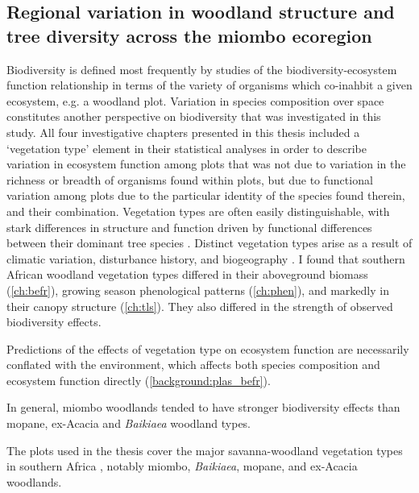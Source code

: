 \begin{refsection}


\subsection{Regional variation in woodland structure and tree diversity across the miombo ecoregion}

Biodiversity is defined most frequently by studies of the biodiversity-ecosystem function relationship in terms of the variety of organisms which co-inahbit a given ecosystem, e.g. a woodland plot. Variation in species composition over space constitutes another perspective on biodiversity that was investigated in this study. All four investigative chapters presented in this thesis included a `vegetation type' element in their statistical analyses in order to describe variation in ecosystem function among plots that was not due to variation in the richness or breadth of organisms found within plots, but due to functional variation among plots due to the particular identity of the species found therein, and their combination. Vegetation types are often easily distinguishable, with stark differences in structure and function driven by functional differences between their dominant tree species \citep{Solbrig1996}. Distinct vegetation types arise as a result of climatic variation, disturbance history, and biogeography \citep{}. I found that southern African woodland vegetation types differed in their aboveground biomass (\autoref{ch:befr}), growing season phenological patterns (\autoref{ch:phen}), and markedly in their canopy structure (\autoref{ch:tls}). They also differed in the strength of observed biodiversity effects. 

Predictions of the effects of vegetation type on ecosystem function are necessarily conflated with the environment, which affects both species composition and ecosystem function directly (\autoref{background:plas_befr}). 

In general, miombo woodlands tended to have stronger biodiversity effects than mopane, ex-Acacia and \textit{Baikiaea} woodland types. 

The plots used in the thesis cover the major savanna-woodland vegetation types in southern Africa \citep{}, notably miombo, \textit{Baikiaea}, mopane, and ex-Acacia woodlands.


\end{refsection}
